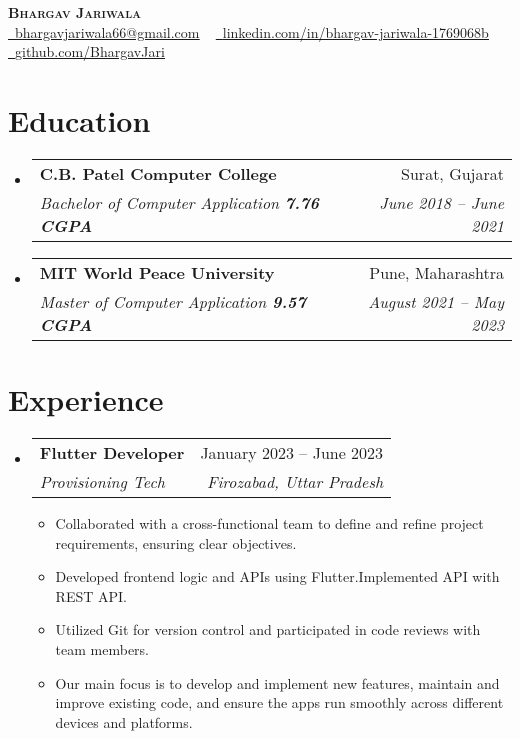 \documentclass[letterpaper,11pt]{article}
\makeatletter
\newcommand{\resumeItem}[1]{
  \item\small{
    {#1 \vspace{-4pt}}
  }
}
\newcommand{\resumeSubheading}[4]{
  \vspace{-2pt}\item
    \begin{tabular*}{0.97\textwidth}[t]{l@{\extracolsep{\fill}}r}
      \textbf{#1} & #2 \\
      \textit{\small#3} & \textit{\small #4} \\
    \end{tabular*}\vspace{-7pt}
}
\newcommand{\resumeSubHeadingListStart}{\begin{itemize}[leftmargin=0.05in, label={}]}
\newcommand{\resumeSubHeadingListEnd}{\end{itemize}}
\newcommand{\resumeItemListStart}{\begin{itemize}\vspace{2pt}}
\newcommand{\resumeItemListEnd}{\end{itemize}\vspace{-5pt}}
\makeatother
\begin{document}

\begin{center}
    \textbf{\Huge \scshape Bhargav Jariwala} \\ \vspace{1pt}
    \href{mailto:x@gmail.com}{\raisebox{-0.2\height}\faEnvelope\  \underline{bhargavjariwala66@gmail.com}} ~ 
    \href{https://linkedin.com/in//}{\raisebox{-0.2\height}\faLinkedin\ \underline{linkedin.com/in/bhargav-jariwala-1769068b}}  ~
    \href{https://github.com/}{\raisebox{-0.2\height}\faGithub\ \underline{github.com/BhargavJari}}
    \vspace{-8pt}
\end{center}


\section{Education}
  \resumeSubHeadingListStart
    \resumeSubheading
       {C.B. Patel Computer College}{Surat, Gujarat}
      {Bachelor of Computer Application  \textbf{7.76 CGPA}}{June 2018 -- June 2021}
    \resumeSubheading
       {MIT World Peace University}{Pune, Maharashtra}
      {Master of Computer Application  \textbf{9.57 CGPA}}{August 2021 -- May 2023}
  \resumeSubHeadingListEnd


\section{Experience}
  \resumeSubHeadingListStart

    \resumeSubheading
      {Flutter Developer}{January 2023 -- June 2023}
      {Provisioning Tech}{Firozabad, Uttar Pradesh}
      \resumeItemListStart
        \resumeItem{Collaborated with a cross-functional team to define and refine project requirements, ensuring clear objectives.}
        \resumeItem{Developed frontend logic and APIs using Flutter.Implemented API with REST API.}
        \resumeItem{ Utilized Git for version control and participated in code reviews with team members.}
         \resumeItem{Our main focus is to develop and implement 
        new features, maintain and improve existing code, and ensure the apps run smoothly across different devices and platforms.}
      \resumeItemListEnd
    \resumeSubHeadingListEnd
      
\end{document}
